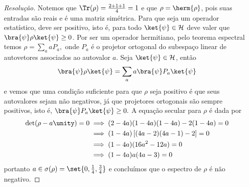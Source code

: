\begin{proof}[Resolução]
   Notemos que \(\Tr(\rho) = \frac{2 + 1 + 1}{4} = 1\) e que \(\rho = \herm{\rho}\), pois suas entradas são reais e é uma matriz simétrica. Para que seja um operador estatístico, deve ser positivo, isto é, para todo \(\ket{\psi} \in \mathcal{H}\) deve valer que \(\bra{\psi}\rho\ket{\psi} \geq 0\). Por ser um operador hermitiano, pelo teorema espectral temos \(\rho = \sum_{a} a P_a,\) onde \(P_a\) é o projetor ortogonal do subespaço linear de autovetores associados ao autovalor \(a\). Seja \(\ket{\psi} \in \mathcal{H}\), então 
   \begin{equation*}
      \bra{\psi}\rho\ket{\psi} = \sum_{a} a \bra{\psi}P_a\ket{\psi}
   \end{equation*}
   e vemos que uma condição suficiente para que \(\rho\) seja positivo é que seus autovalores sejam não negativos, já que projetores ortogonais são sempre positivos, isto é, \(\bra{\psi}P_a\ket{\psi} \geq 0.\) A equação secular para \(\rho\) é dada por
   \begin{align*}
      \det(\rho - a\unity) = 0 &\implies (2 - 4a)(1 - 4a)(1 - 4a) - 2(1 - 4a) = 0\\
                               &\implies (1 - 4a)\left[(4a - 2)(4a - 1) - 2\right] = 0\\
                               &\implies (1 - 4a)(16a^2 - 12a) = 0\\
                               &\implies (1 - 4a)a(4a - 3) = 0
   \end{align*}
   portanto \(a \in \sigma(\rho) = \set{0,\frac14,\frac34}\) e concluímos que o espectro de \(\rho\) é não negativo.

\end{proof}
